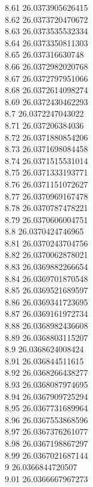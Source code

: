 {8.61	26.0373905626415\\
8.62	26.0373720470672\\
8.63	26.0373535532334\\
8.64	26.0373350811303\\
8.65	26.037316630748\\
8.66	26.0372982020768\\
8.67	26.0372797951066\\
8.68	26.0372614098274\\
8.69	26.0372430462293\\
8.7	26.0372247043022\\
8.71	26.037206384036\\
8.72	26.0371880854206\\
8.73	26.0371698084458\\
8.74	26.0371515531014\\
8.75	26.0371333193771\\
8.76	26.0371151072627\\
8.77	26.0370969167478\\
8.78	26.0370787478221\\
8.79	26.0370606004751\\
8.8	26.0370424746965\\
8.81	26.0370243704756\\
8.82	26.0370062878021\\
8.83	26.0369882266654\\
8.84	26.0369701870548\\
8.85	26.0369521689597\\
8.86	26.0369341723695\\
8.87	26.0369161972734\\
8.88	26.0368982436608\\
8.89	26.0368803115207\\
8.9	26.0368624008424\\
8.91	26.036844511615\\
8.92	26.0368266438277\\
8.93	26.0368087974695\\
8.94	26.0367909725294\\
8.95	26.0367731689964\\
8.96	26.0367553868596\\
8.97	26.0367376261077\\
8.98	26.0367198867297\\
8.99	26.0367021687144\\
9	26.0366844720507\\
9.01	26.0366667967273\\
}
